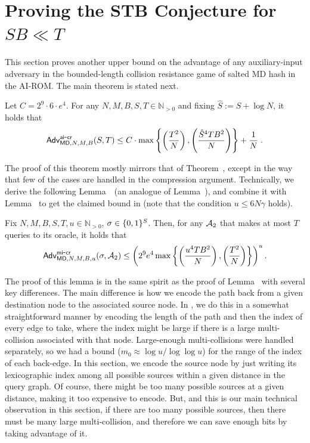 \section{Proving the STB Conjecture for $SB \ll T$}\label{sec:secbound}
This section proves another upper bound on the advantage of any auxiliary-input adversary in the bounded-length collision resistance game of salted MD hash in the AI-ROM. The main theorem is stated next. 
\begin{theorem}\label{thm:MDST2}
    Let $C = 2^9\cdot 6 \cdot e^4$. For any $N,M,B,S,T\in \mathbb{N}_{>0}$ and fixing $\hat S := S + \log N$, it holds that 
    \begin{align*}
    \mathsf{Adv}_{\mathsf{MD},N,M,B}^{{\mathsf{ai}\mbox{-}\mathsf{cr}}}(S,T) \leq C\cdot \max\left\{\left(\frac{T^2}{N}\right),\left(\frac{\hat S^4TB^2}{N}\right)\right\}+\frac{1}{N}\;.    \end{align*}
\end{theorem}


The proof of this theorem mostly mirrors that of Theorem~, except in the way that few of the cases are handled in the compression argument. Technically, we derive the following Lemma~~(an analogue of Lemma~), and combine it with Lemma~ to get the claimed bound in  (note that the condition $u\leq 6N\gamma$ holds).
\begin{lemma}\label{lem:secbound}
    Fix $N,M,B,S,T,u\in \mathbb{N}_{>0}$, $\sigma\in \{0,1\}^S$. Then, for any $\mathcal{A}_2$ that makes at most $T$ queries to its oracle, it holds that
    \begin{align*}
    \mathsf{Adv}_{\mathsf{MD},N,M,B,u}^{{\mathsf{mi}\mbox{-}\mathsf{cr}}}(\sigma,\mathcal{A}_2) \leq\left(2^9e^4\max\left\{\left(\frac{u^4TB^2}{N}\right),\left(\frac{T^2}{N}\right)\right\}\right)^u. 
\end{align*}
\end{lemma}


The proof of this lemma is in the same spirit as the proof of Lemma~ with several key differences. The main difference is how we encode the path back from a given destination node to the associated source node. In , we do this in a somewhat straightforward manner by encoding the length of the path and then the index of every edge to take, where the index might be large if there is a large multi-collision associated with that node. Large-enough multi-collisions were handled separately, so we had a bound ($m_0 \approx \log u /\log\log u$) for the range of the index of each back-edge. In this section, we encode the source node by just writing its lexicographic index among all possible sources within a given distance in the query graph. Of course, there might be too many possible sources at a given distance, making it too expensive to encode. But, and this is our main technical observation in this section, if there are too many possible sources, then there must be many large multi-collision, and therefore we can save enough bits by taking advantage of it.


